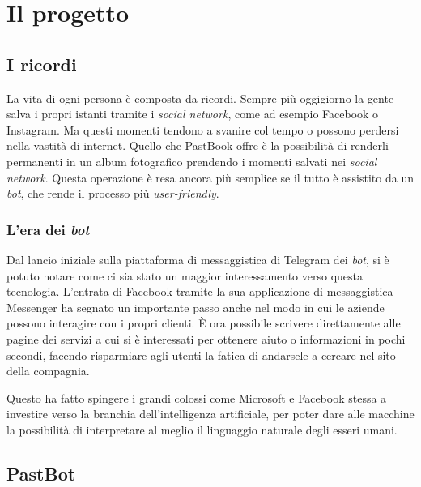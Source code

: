 
\chapter{Il progetto}
\label{cap:progetto}

\section{I ricordi}

La vita di ogni persona è composta da ricordi. Sempre più oggigiorno la gente
salva i propri istanti tramite i \textit{social network}, come ad esempio
Facebook o Instagram. Ma questi momenti tendono a svanire col tempo o possono
perdersi nella vastità di internet. Quello che PastBook offre è la
possibilità di renderli permanenti in un album fotografico prendendo i momenti
salvati nei \textit{social network}. Questa operazione è resa ancora più
semplice se il tutto è assistito da un \textit{bot}, che rende il processo più
\textit{user-friendly}.

\subsection{L'era dei \textit{bot}}

Dal lancio iniziale sulla piattaforma di messaggistica di Telegram dei
\textit{bot}, si è potuto notare come ci sia stato un maggior interessamento
verso questa tecnologia. L'entrata di Facebook tramite la sua applicazione di
messaggistica Messenger ha segnato un importante passo anche nel modo in cui le
aziende possono interagire con i propri clienti. È ora possibile scrivere
direttamente alle pagine dei servizi a cui si è interessati per ottenere aiuto o
informazioni in pochi secondi, facendo risparmiare agli utenti la fatica di
andarsele a cercare nel sito della compagnia.

Questo ha fatto spingere i grandi colossi come Microsoft e Facebook stessa a
investire verso la branchia dell'intelligenza artificiale, per poter dare
alle macchine la possibilità di interpretare al meglio il linguaggio naturale
degli esseri umani.

\newpage

\section{PastBot}

